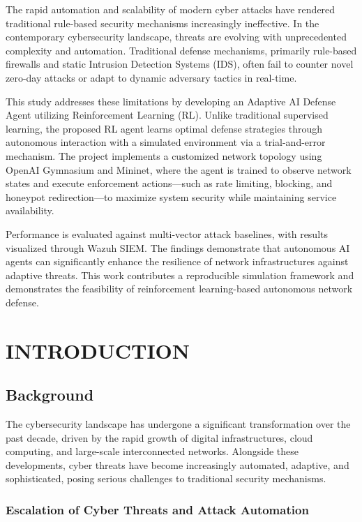 \documentclass[12pt,a4paper]{report}
\begin{document}
The rapid automation and scalability of modern cyber attacks have rendered traditional rule-based security mechanisms increasingly ineffective. In the contemporary cybersecurity landscape, threats are evolving with unprecedented complexity and automation. Traditional defense mechanisms, primarily rule-based firewalls and static Intrusion Detection Systems (IDS), often fail to counter novel zero-day attacks or adapt to dynamic adversary tactics in real-time.

This study addresses these limitations by developing an Adaptive AI Defense Agent utilizing Reinforcement Learning (RL). Unlike traditional supervised learning, the proposed RL agent learns optimal defense strategies through autonomous interaction with a simulated environment via a trial-and-error mechanism. The project implements a customized network topology using OpenAI Gymnasium and Mininet, where the agent is trained to observe network states and execute enforcement actions---such as rate limiting, blocking, and honeypot redirection---to maximize system security while maintaining service availability.

Performance is evaluated against multi-vector attack baselines, with results visualized through Wazuh SIEM. The findings demonstrate that autonomous AI agents can significantly enhance the resilience of network infrastructures against adaptive threats. This work contributes a reproducible simulation framework and demonstrates the feasibility of reinforcement learning-based autonomous network defense.

\tableofcontents

\chapter{INTRODUCTION}

\section{Background}

The cybersecurity landscape has undergone a significant transformation over the past decade, driven by the rapid growth of digital infrastructures, cloud computing, and large-scale interconnected networks.
Alongside these developments, cyber threats have become increasingly automated, adaptive, and sophisticated, posing serious challenges to traditional security mechanisms.

\subsection{Escalation of Cyber Threats and Attack Automation}
\end{document}

